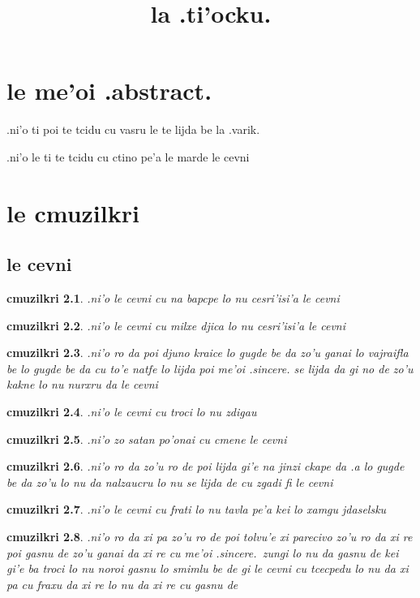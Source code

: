 \documentclass{report}
\title{la .ti'ocku.}
\newtheorem{cmuzilkri}{cmuzilkri}
\begin{document}
\maketitle
\chapter{le me'oi .abstract.}
.ni'o ti poi te tcidu cu vasru le te lijda be la .varik.

.ni'o le ti te tcidu cu ctino pe'a le marde le cevni

\chapter{le cmuzilkri}
\section{le cevni}
\begin{cmuzilkri}
	.ni'o le cevni cu na bapcpe lo nu cesri'isi'a le cevni
\end{cmuzilkri}
\begin{cmuzilkri}
	.ni'o le cevni cu milxe djica lo nu cesri'isi'a le cevni
\end{cmuzilkri}
\begin{cmuzilkri}
	.ni'o ro da poi djuno kraice lo gugde be da zo'u ganai lo vajraifla be lo gugde be da cu to'e natfe lo lijda poi me'oi .sincere. se lijda da gi no de zo'u kakne lo nu nurxru da le cevni
\end{cmuzilkri}
\begin{cmuzilkri}
	.ni'o le cevni cu troci lo nu zdigau
\end{cmuzilkri}
\begin{cmuzilkri}
	.ni'o zo satan po'onai cu cmene le cevni
\end{cmuzilkri}
\begin{cmuzilkri}
	.ni'o ro da zo'u ro de poi lijda gi'e na jinzi ckape da .a lo gugde be da zo'u lo nu da nalzaucru lo nu se lijda de cu zgadi fi le cevni
\end{cmuzilkri}
\begin{cmuzilkri}
	.ni'o le cevni cu frati lo nu tavla pe'a kei lo xamgu jdaselsku
\end{cmuzilkri}
\begin{cmuzilkri}
	.ni'o ro da xi pa zo'u ro de poi tolvu'e xi parecivo zo'u ro da xi re poi gasnu de zo'u ganai da xi re cu me'oi .sincere.\ zungi lo nu da gasnu de kei gi'e ba troci lo nu noroi gasnu lo smimlu be de gi le cevni cu tcecpedu lo nu da xi pa cu fraxu da xi re lo nu da xi re cu gasnu de
\end{cmuzilkri}
\end{document}
